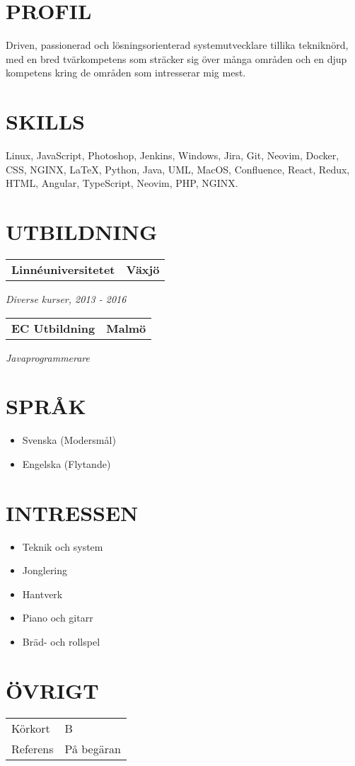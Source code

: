 \documentclass[11pt,a4paper]{moderncv}
\newcommand*{\educationentry}[4][0.5mm]{
    \begin{tabularx}{\textwidth}{LR}
        {\bfseries #3} & {\bfseries #4} \\
    \end{tabularx}
    {\itshape #2}
    \par\addvspace{#1}
}
\begin{document}
\hfill
\begin{minipage}[t]{0.35\textwidth}
\section{PROFIL}
Driven, passionerad och lösningsorienterad systemutvecklare tillika tekniknörd, med en bred tvärkompetens som sträcker sig över många områden och en djup kompetens kring de områden som intresserar mig mest.

\section{SKILLS}
Linux, JavaScript, Photoshop, Jenkins, Windows, Jira, Git, Neovim, Docker, CSS, NGINX, \LaTeX, Python, Java, UML, MacOS, Confluence, React, Redux, HTML, Angular, TypeScript, Neovim, PHP, NGINX.

\section{UTBILDNING}
\educationentry{Diverse kurser, 2013 - 2016}{Linnéuniversitetet}{Växjö}
\educationentry{Javaprogrammerare}{EC Utbildning}{Malmö}

\section{SPRÅK}
\begin{itemize}
    \item Svenska (Modersmål)
    \item Engelska (Flytande)
\end{itemize}

\section{INTRESSEN}
\begin{itemize}
    \item Teknik och system
    \item Jonglering
    \item Hantverk
    \item Piano och gitarr
    \item Bräd- och rollspel
\end{itemize}

\section{ÖVRIGT}
\begin{tabularx}{\textwidth}{L L}
  Körkort & B \\
  Referens & På begäran

\end{tabularx}

\end{minipage}
\end{document}
